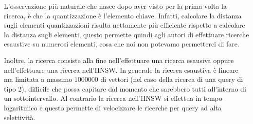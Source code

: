 L'osservazione più naturale che nasce dopo aver visto per la prima volta la ricerca,
è che la quantizzazione è l'elemento chiave. Infatti, calcolare la distanza sugli 
elementi quantizzazioni risulta nettamente più efficiente rispetto a calcolare la 
distanza sugli elementi, questo permette quindi agli autori di effettuare ricerche 
esaustive su numerosi elementi, cosa che noi non potevamo permetterci di fare.

Inoltre, la ricerca consiste alla fine nell'effettuare una ricerca esausiva 
oppure nell'effettuare una ricerca nell'HNSW. In generale la ricerca esaustiva è 
lineare ma limitata a massimo $1000000$ di vettori (nel caso della ricerca di una 
query di tipo 2), difficile che possa capitare dal momento che sarebbero tutti 
all'interno di un sottointervallo. Al contrario la ricerca nell'HNSW si effettua 
in tempo logaritmico e questo permette di velocizzare le ricerche per query ad 
alta selettività. 


